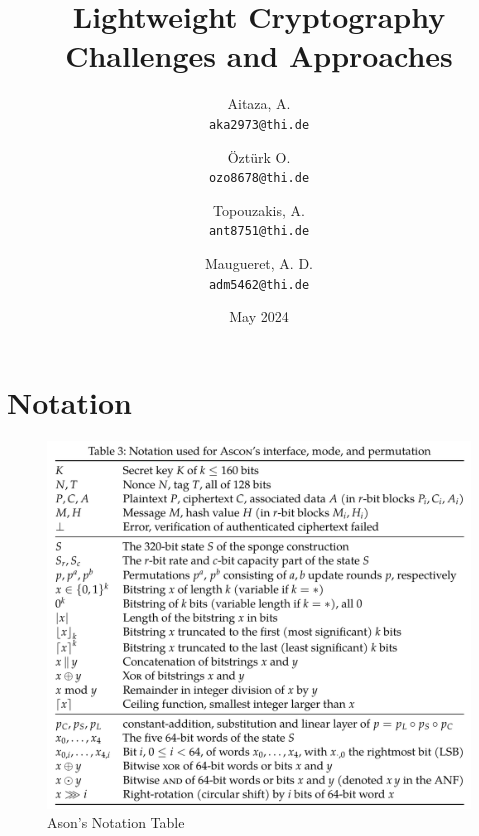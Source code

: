 \documentclass{article}
\date{May 2024}
\title{Lightweight Cryptography Challenges and Approaches}
\author{
  Aitaza, A. \\
  \texttt{aka2973@thi.de}
  \and
  Öztürk O.\\
  \texttt{ozo8678@thi.de}   
  \and
  Topouzakis, A. \\
  \texttt{ant8751@thi.de}
  \and
  Maugueret, A. D.\\
  \texttt{adm5462@thi.de}
  }
\begin{document}
\maketitle
\tableofcontents

\section*{Notation}

\begin{figure}[H] 
    \centering 
    \includegraphics[width=1\textwidth]{figures/ascon-notation.png}
    \caption{Ason's Notation Table \cite{Ascon-v1.2}}
    \label{fig:ascon-notation} 
  \end{figure}








\end{document}
